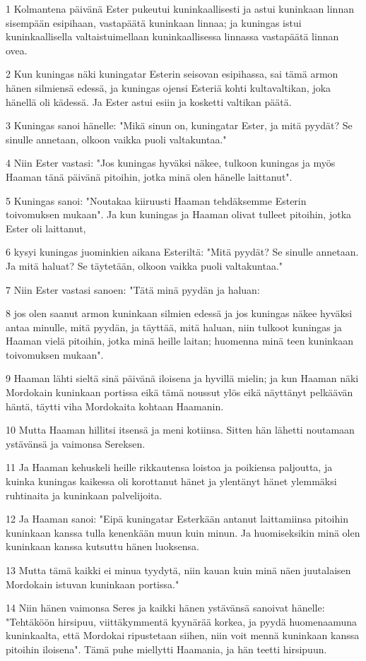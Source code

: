 \par 1 Kolmantena päivänä Ester pukeutui kuninkaallisesti ja astui kuninkaan linnan sisempään esipihaan, vastapäätä kuninkaan linnaa; ja kuningas istui kuninkaallisella valtaistuimellaan kuninkaallisessa linnassa vastapäätä linnan ovea.
\par 2 Kun kuningas näki kuningatar Esterin seisovan esipihassa, sai tämä armon hänen silmiensä edessä, ja kuningas ojensi Esteriä kohti kultavaltikan, joka hänellä oli kädessä. Ja Ester astui esiin ja kosketti valtikan päätä.
\par 3 Kuningas sanoi hänelle: "Mikä sinun on, kuningatar Ester, ja mitä pyydät? Se sinulle annetaan, olkoon vaikka puoli valtakuntaa."
\par 4 Niin Ester vastasi: "Jos kuningas hyväksi näkee, tulkoon kuningas ja myös Haaman tänä päivänä pitoihin, jotka minä olen hänelle laittanut".
\par 5 Kuningas sanoi: "Noutakaa kiiruusti Haaman tehdäksemme Esterin toivomuksen mukaan". Ja kun kuningas ja Haaman olivat tulleet pitoihin, jotka Ester oli laittanut,
\par 6 kysyi kuningas juominkien aikana Esteriltä: "Mitä pyydät? Se sinulle annetaan. Ja mitä haluat? Se täytetään, olkoon vaikka puoli valtakuntaa."
\par 7 Niin Ester vastasi sanoen: "Tätä minä pyydän ja haluan:
\par 8 jos olen saanut armon kuninkaan silmien edessä ja jos kuningas näkee hyväksi antaa minulle, mitä pyydän, ja täyttää, mitä haluan, niin tulkoot kuningas ja Haaman vielä pitoihin, jotka minä heille laitan; huomenna minä teen kuninkaan toivomuksen mukaan".
\par 9 Haaman lähti sieltä sinä päivänä iloisena ja hyvillä mielin; ja kun Haaman näki Mordokain kuninkaan portissa eikä tämä noussut ylös eikä näyttänyt pelkäävän häntä, täytti viha Mordokaita kohtaan Haamanin.
\par 10 Mutta Haaman hillitsi itsensä ja meni kotiinsa. Sitten hän lähetti noutamaan ystävänsä ja vaimonsa Sereksen.
\par 11 Ja Haaman kehuskeli heille rikkautensa loistoa ja poikiensa paljoutta, ja kuinka kuningas kaikessa oli korottanut hänet ja ylentänyt hänet ylemmäksi ruhtinaita ja kuninkaan palvelijoita.
\par 12 Ja Haaman sanoi: "Eipä kuningatar Esterkään antanut laittamiinsa pitoihin kuninkaan kanssa tulla kenenkään muun kuin minun. Ja huomiseksikin minä olen kuninkaan kanssa kutsuttu hänen luoksensa.
\par 13 Mutta tämä kaikki ei minua tyydytä, niin kauan kuin minä näen juutalaisen Mordokain istuvan kuninkaan portissa."
\par 14 Niin hänen vaimonsa Seres ja kaikki hänen ystävänsä sanoivat hänelle: "Tehtäköön hirsipuu, viittäkymmentä kyynärää korkea, ja pyydä huomenaamuna kuninkaalta, että Mordokai ripustetaan siihen, niin voit mennä kuninkaan kanssa pitoihin iloisena". Tämä puhe miellytti Haamania, ja hän teetti hirsipuun.

